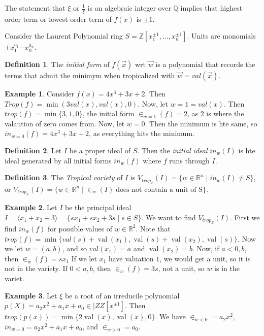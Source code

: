 \documentclass[12pt]{memoir}
\DeclareMathOperator{\val}{val}
\theoremstyle{definition}
\newtheorem{protoexample}{Example}[section]
\newenvironment{ex}
   {\begin{protoexample}}
   {\end{protoexample}}
\newtheorem{protodefinition}{Definition}[section]
\newenvironment{define}
   {\begin{protodefinition}}
   {\end{protodefinition}}
\def\ZZ{{\mathbb Z}}
\def\QQ{{\mathbb Q}}
\def\RR{{\mathbb R}}
\begin{document}
The statement that $\xi$ or $\frac{1}{\xi}$ is an algebraic integer over $\QQ$ implies that highest order term or lowest order term of $f(x)$ is $\pm 1$.


Consider the Laurent Polynomial ring $S = \ZZ[x_1^{\pm 1}, \dots, x_n^{\pm 1}]$. Units are monomials $\pm x_1^{a_1}\cdots x_n^{a_n}$.

\begin{define}
The \emph{initial form} of $f(\overrightarrow{x})$ wrt $\overrightarrow{w}$ is a polynomial that records the terms that admit the minimym when tropicalized with $\overrightarrow{w} =val(\overrightarrow{x})$.
\end{define}
\begin{ex}
    Consider $f(x) = 4x^3+3x+2$. Then $Trop(f) = \min(3val(x), val(x), 0)$. Now, let $w=1=val(x)$. Then $trop(f)=\min\{3,1,0\}$, the initial form $\in_{w=1}(f) = 2$, as $2$ is where the valaution of zero comes from. Now, let $w=0$. Then the minimum is hte same, so $in_{w=0}(f) = 4x^3+3x+2$, as everything hits the minimum.
\end{ex}


\begin{define}
    Let $I$ be a proper ideal of $S$.  Then the \emph{initial ideal} $in_w(I)$ is hte ideal generated by all initial forms $in_w(f)$ where $f$ runs through $I$.
\end{define}


\begin{define}
The \emph{Tropical variety} of $I$ is $V_{trop_\ZZ}(I) = \{w \in \RR^n\; |\; in_w(I) \neq S\}$, or $V_{trop_\ZZ}(I) = \{ w \in \RR^n \; |\; \in_w(I) \; \text{does not contain a unit of S}\}$.
\end{define}



\begin{ex}
Let $I$ be the principal ideal $I = \langle x_1 +x_2 + 3\rangle= \{sx_1+sx_2+3s\; |\; s\in S\}$. We want to find $V_{trop_\ZZ}(I)$. First we find $in_w(f)$ for possible values of $w\in \RR^2$. Note that $trop(f)= \min\{val(s) + \val(x_1), \val(s) + \val(x_2), \val(s)\}$. Now we let $w=(a,b)$, and so $val(x_1)=a$ and $\val(x_2)=b$. Now, if $a<0,b$, then $\in_w(f) = sx_1$ If we let $x_1$ have valuation $1$, we would get a unit, so it is not in the variety. If $0<a,b$, then $\in_w(f)=3s$, not a unit, so $w$ is in the variet.
\end{ex}


\begin{ex}
Let $\xi$ be a root of an irreducile polynomial $p(X) =a_2x^2+a_1x+a_0\in |ZZ[x^{\pm1}]$. Then $trop(p(x)) = \min\{2\val(x), \val(x), 0\}$. We have $\in_{w<0}=a_2x^2$, $in_{w =0} = a_2x^2+a_1x+a_0$, and $\in_{w>0} =a_0$.
\end{ex}
\end{document}
